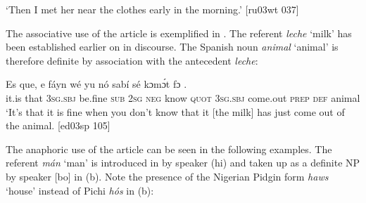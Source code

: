 \glt ‘Then I met her near the clothes early in the morning.’ [ru03wt 037]
\z

The associative use of the article is exemplified in . The referent \textit{leche} ‘milk’ has been established earlier on in discourse. The Spanish noun \textit{a}\textit{nimal} ‘animal’ is therefore definite by association with the antecedent \textit{leche}:


\ea%
    \label{ex:key:171}
    \gll Es  que,    e    fáyn    wé  yu  nó  sabí    sé 
    kɔmɔ́t    fɔ   .\\
it.is  that    \textsc{3sg.sbj}  be.fine  \textsc{sub}  \textsc{2sg}  \textsc{neg}  know  \textsc{quot} 
\textsc{3sg.sbj}  come.out  \textsc{prep}  \textsc{def}  animal\\

\glt ‘It’s that it is fine when you don’t know that it [the milk] has just come out of the animal. [ed03sp 105]
\z

The anaphoric use of the article can be seen in the following examples. The referent \textit{mán} ‘man’ is introduced in  by speaker (hi) and taken up as a definite \textsc{NP} by speaker [bo] in (b). Note the presence of the Nigerian Pidgin form \textit{haws} ‘house’ instead of Pichi \textit{hós} in (b):


\ea%
    \label{ex:key:172}

\z
\z




